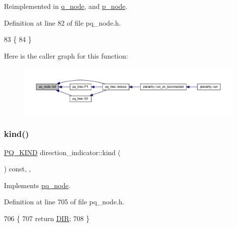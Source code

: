 Reimplemented in \mbox{\hyperlink{classq__node_a525633c6276761fa795a9b54688cc036}{q\+\_\+node}}, and \mbox{\hyperlink{classp__node_a0ba10aa3a56e26676d78af2e05fb5cd1}{p\+\_\+node}}.



Definition at line 82 of file pq\+\_\+node.\+h.


\begin{DoxyCode}
83     \{
84     \}
\end{DoxyCode}
Here is the caller graph for this function\+:
\nopagebreak
\begin{figure}[H]
\begin{center}
\leavevmode
\includegraphics[width=350pt]{classpq__node_af1ba861293e4493dba7cc2c9332fee76_icgraph}
\end{center}
\end{figure}
\mbox{\label{classdirection__indicator_ab0ffeb761ec0d157b4c6ba13ece96d9b}} 
\subsubsection{\texorpdfstring{kind()}{kind()}}
{\footnotesize\ttfamily \mbox{\hyperlink{classpq__node_a96827bdca8bf81d20213405dd27f8fa6}{P\+Q\+\_\+\+K\+I\+ND}} direction\+\_\+indicator\+::kind (\begin{DoxyParamCaption}{ }\end{DoxyParamCaption}) const\hspace{0.3cm}{\ttfamily [inline]}, {\ttfamily [private]}, {\ttfamily [virtual]}}



Implements \mbox{\hyperlink{classpq__node_aa9873c0cfad88bc4404857ce57d422e4}{pq\+\_\+node}}.



Definition at line 705 of file pq\+\_\+node.\+h.


\begin{DoxyCode}
706     \{
707     \textcolor{keywordflow}{return} \mbox{\hyperlink{classpq__node_a96827bdca8bf81d20213405dd27f8fa6a5afa3e7100ee720a1569cfff090a210d}{DIR}};
708     \}
\end{DoxyCode}
\mbox{\label{classdirection__indicator_ad05d1484cc0ac57669dfd308ae1fbaa4}} 
